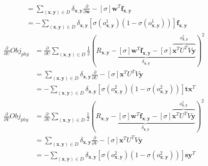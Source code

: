 \documentclass{sig-alternate}
\newcommand{\Obj}{\mathit{Obj}}
\newcommand{\phy}{\mathit{phy}}
\newcommand{\x}{\vec{x}}
\newcommand{\y}{\vec{y}}
\newcommand{\w}{\vec{w}}
\newcommand{\f}{\vec{f}}
\newcommand{\s}{\vec{s}}
\renewcommand{\t}{\vec{t}}
\renewcommand{\vec}[1]{\mathbf{#1}}
\begin{document}
\begin{itemize}
\begin{align*}
& = \sum_{(\x,\y) \in D} \delta_{\x,\y} \frac{\partial}{\partial \w} - [\sigma] \w^T \f_{\x,\y} \\
& = - \sum_{(\x,\y) \in D} \delta_{\x,\y} [\sigma(o^1_{\x,\y}) (1 - \sigma(o^1_{\x,\y}))] \f_{\x,\y} 
\end{align*}
\begin{align*}
\frac{\partial}{\partial U} \Obj_\phy & = \frac{\partial}{\partial U} \sum_{(\x,\y) \in D} \frac{1}{2} \left( \underbrace{R_{\x,\y} - [\sigma] \w^T \f_{\x,\y} - [\sigma] \overbrace{\x^T U^T V\y}^{o^2_{\x,\y}}}_{\delta_{\x,\y}}\right)^2 \\
& = \sum_{(\x,\y) \in D} \delta_{\x,\y} \frac{\partial}{\partial U} - [\sigma] \x^T U^T V\y \\
& = - \sum_{(\x,\y) \in D} \delta_{\x,\y} [\sigma(o^2_{\x,\y}) (1 - \sigma(o^2_{\x,\y}))] \t \x^T\\
\frac{\partial}{\partial V} \Obj_\phy & = \frac{\partial}{\partial V} \sum_{(\x,\y) \in D} \frac{1}{2} \left( \underbrace{R_{\x,\y} - [\sigma] \w^T \f_{\x,\y} - [\sigma] \overbrace{\x^T U^T V\y}^{o^2_{\x,\y}}}_{\delta_{\x,\y}}\right)^2 \\
& = \sum_{(\x,\y) \in D}  \delta_{\x,\y} \frac{\partial}{\partial V} - [\sigma] \x^T U^T V\y \\
& = - \sum_{(\x,\y) \in D}  \delta_{\x,\y} [\sigma(o^2_{\x,\y}) (1 - \sigma(o^2_{\x,\y}))] \s \y^T \\
\end{align*}
\end{itemize}
\end{document}
